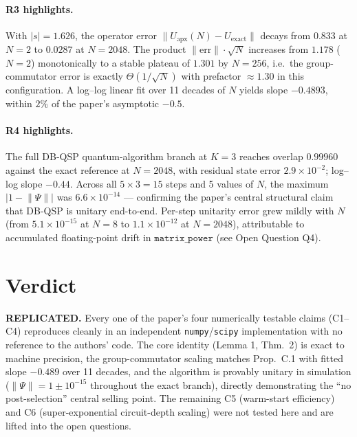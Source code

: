 \documentclass[11pt]{article}
\begin{document}
\paragraph{R3 highlights.} With $|s|=1.626$, the operator error $\lVert U_{\text{apx}}(N) - U_{\text{exact}}\rVert$ decays from $0.833$ at $N=2$ to $0.0287$ at $N=2048$. The product $\lVert\text{err}\rVert\cdot\sqrt{N}$ increases from $1.178$ ($N=2$) monotonically to a stable plateau of $1.301$ by $N=256$, i.e.\ the group-commutator error is exactly $\Theta(1/\sqrt{N})$ with prefactor $\approx 1.30$ in this configuration. A log--log linear fit over 11 decades of $N$ yields slope $-0.4893$, within $2\%$ of the paper's asymptotic $-0.5$.

\paragraph{R4 highlights.} The full DB-QSP quantum-algorithm branch at $K=3$ reaches overlap $0.99960$ against the exact reference at $N=2048$, with residual state error $2.9\times 10^{-2}$; log--log slope $-0.44$. Across all $5\times 3=15$ steps and 5 values of $N$, the maximum $|1-\lVert\Psi\rVert|$ was $6.6\times 10^{-14}$ --- confirming the paper's central structural claim that DB-QSP is unitary end-to-end. Per-step unitarity error grew mildly with $N$ (from $5.1\times 10^{-15}$ at $N=8$ to $1.1\times 10^{-12}$ at $N=2048$), attributable to accumulated floating-point drift in $\texttt{matrix\_power}$ (see Open Question Q4).

\section{Verdict}
\textbf{REPLICATED.} Every one of the paper's four numerically testable claims (C1--C4) reproduces cleanly in an independent \texttt{numpy}/\texttt{scipy} implementation with no reference to the authors' code. The core identity (Lemma 1, Thm.~2) is exact to machine precision, the group-commutator scaling matches Prop.~C.1 with fitted slope $-0.489$ over 11 decades, and the algorithm is provably unitary in simulation ($\lVert\Psi\rVert = 1 \pm 10^{-15}$ throughout the exact branch), directly demonstrating the ``no post-selection'' central selling point. The remaining C5 (warm-start efficiency) and C6 (super-exponential circuit-depth scaling) were not tested here and are lifted into the open questions.
\end{document}
